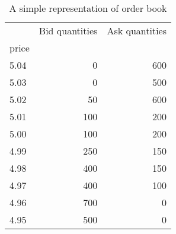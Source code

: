 \begin{table}
\centering
\caption{A simple representation of order book}
\label{tbl:orderbook}
\begin{tabular}{lrr}
\toprule
{} &  Bid quantities &  Ask quantities \\
price &                 &                 \\
\midrule
5.04  &               0 &             600 \\
5.03  &               0 &             500 \\
5.02  &              50 &             600 \\
5.01  &             100 &             200 \\
5.00  &             100 &             200 \\
4.99  &             250 &             150 \\
4.98  &             400 &             150 \\
4.97  &             400 &             100 \\
4.96  &             700 &               0 \\
4.95  &             500 &               0 \\
\bottomrule
\end{tabular}
\end{table}

